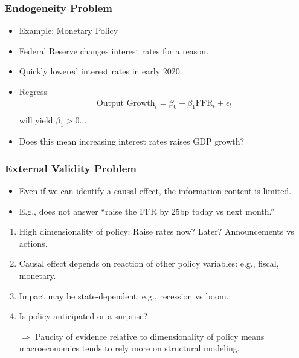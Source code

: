 \documentclass[english,xcolor=svgnames]{beamer}
\begin{document}
\begin{frame}
\frametitle[alignment=center]{Endogeneity Problem}
\begin{itemize}
	\item Example: Monetary Policy
	\item Federal Reserve changes interest rates for a reason.
	\item Quickly lowered interest rates in early 2020.
	\item Regress
	\begin{align*}
		\text{Output Growth}_t = \beta_0 +\beta_1 \text{FFR}_t + \epsilon_t \\
	\end{align*}
	will yield $\beta_1>0$...
	\item Does this mean increasing interest rates raises GDP growth?
\end{itemize}
\end{frame}

\begin{frame}
\frametitle[alignment=center]{External Validity Problem}
\begin{itemize}
	\item Even if we can identify a causal effect, the information content is limited.
	\item E.g., does not answer ``raise the FFR by 25bp today vs next month.''
\end{itemize}
\begin{enumerate}
	\item High dimensionality of policy: Raise rates now? Later? Announcements vs actions.
	\item Causal effect depends on reaction of other policy variables: e.g., fiscal, monetary.
	\item Impact may be state-dependent: e.g., recession vs boom.
	\item Is policy anticipated or a surprise?
\end{enumerate}
\begin{itemize}
	\item[$\Rightarrow$] Paucity of evidence relative to dimensionality of policy means macroeconomics tends to rely more on structural modeling.
\end{itemize}
\end{frame}
\end{document}
